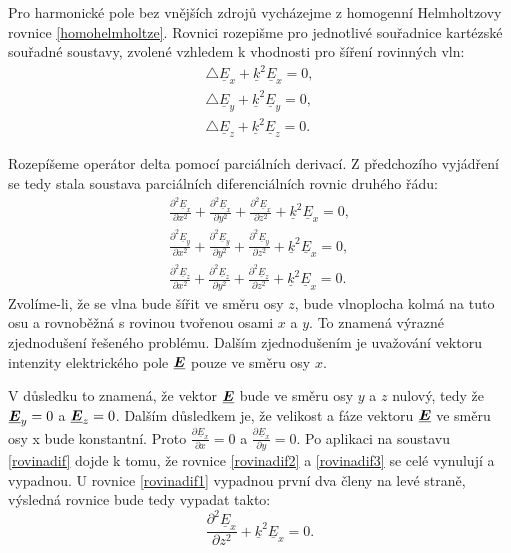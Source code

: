 \documentclass[12pt,a4paper,oneside]{article}
\numberwithin{equation}{section} %
\numberwithin{figure}{section} %
\numberwithin{table}{section} %
\renewcommand{\vec}[1]{\mbox{\boldmath$#1$}} %
\newcommand{\faz}[1]{{\underline{#1}}} %
\begin{document}
Pro harmonické pole bez vnějších zdrojů vycházejme z homogenní Helmholtzovy rovnice \ref{homohelmholtze}. Rovnici rozepišme pro jednotlivé souřadnice kartézské souřadné soustavy, zvolené vzhledem k vhodnosti pro šíření rovinných vln:
\begin{subequations}
\begin{align}
\triangle \faz{E} _x + \faz{k} ^2 \faz{E} _x = 0 ,
\\
\triangle \faz{E} _y + \faz{k} ^2 \faz{E} _y = 0 ,
\\
\triangle \faz{E} _z + \faz{k} ^2 \faz{E} _z = 0 .
\end{align}
\end{subequations} 

Rozepíšeme operátor delta pomocí parciálních derivací. Z předchozího vyjádření se tedy stala soustava parciálních diferenciálních rovnic druhého řádu:
\begin{subequations}
\label{rovinadif}
\begin{align}
\label{rovinadif1}
\frac{\partial ^2 \faz{E} _x }{\partial x ^2} + \frac{\partial ^2 \faz{E} _x }{\partial y ^2} + \frac{\partial ^2 \faz{E} _x }{\partial z ^2} + \faz{k} ^2 \faz{E} _x = 0 ,
\\
\label{rovinadif2}
\frac{\partial ^2 \faz{E} _y }{\partial x ^2} + \frac{\partial ^2 \faz{E} _y }{\partial y ^2} + \frac{\partial ^2 \faz{E} _y }{\partial z ^2} + \faz{k} ^2 \faz{E} _x = 0 ,
\\
\label{rovinadif3}
\frac{\partial ^2 \faz{E} _z }{\partial x ^2} + \frac{\partial ^2 \faz{E} _z }{\partial y ^2} + \frac{\partial ^2 \faz{E} _z }{\partial z ^2} + \faz{k} ^2 \faz{E} _x = 0 .
\end{align}
\end{subequations}
Zvolíme-li, že se vlna bude šířit ve směru osy $z$, bude vlnoplocha kolmá na tuto osu a rovnoběžná s rovinou tvořenou osami $x$ a $y$. To znamená výrazné zjednodušení řešeného problému. Dalším zjednodušením je uvažování vektoru intenzity elektrického pole $\vec{\faz{E}}$ pouze ve směru osy $x$.

V důsledku to znamená, že vektor $\vec{\faz{E}}$ bude ve směru osy $y$ a $z$ nulový, tedy že $\vec{\faz{E}} _y = 0$ a $\vec{\faz{E}} _z = 0$. Dalším důsledkem je, že velikost a fáze vektoru $\vec{\faz{E}}$ ve směru osy x bude konstantní. Proto $\frac{\partial \faz{E} _x}{\partial x} = 0$ a $\frac{\partial \faz{E} _x}{\partial y} = 0$. Po aplikaci na soustavu \ref{rovinadif} dojde k tomu, že rovnice \ref{rovinadif2} a \ref{rovinadif3} se celé vynulují a vypadnou. U rovnice \ref{rovinadif1} vypadnou první dva členy na levé straně, výsledná rovnice bude tedy vypadat takto:
\begin{equation}
\frac{\partial ^2 \faz{E} _x}{\partial z ^2} + \faz{k} ^2 \faz{E} _x = 0 .
\end{equation}
 
\end{document}
